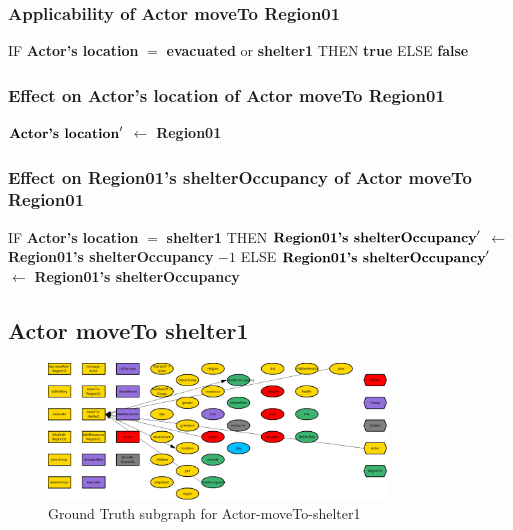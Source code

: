 \documentclass{article}%
\begin{document}
%
\subsubsection{Applicability of Actor moveTo Region01}%
\label{ssubsec:Applicability of Actor moveTo Region01}%
\begin{flushleft}%
IF %
\textbf{Actor's location}%
$=$%
\textbf{evacuated}%
 or %
\textbf{shelter1}%
\linebreak%
\hspace*{2em}%
THEN %
\textbf{true}%
\linebreak%
\hspace*{2em}%
ELSE %
\textbf{false}%
\end{flushleft}

%
\subsubsection{Effect on Actor's location of Actor moveTo Region01}%
\label{ssubsec:Effect on Actor's location of Actor moveTo Region01}%
\begin{flushleft}%
$\mbox{\textbf{Actor's location}} '$%
$\leftarrow$%
\textbf{Region01}%
\end{flushleft}

%
\subsubsection{Effect on Region01's shelterOccupancy of Actor moveTo Region01}%
\label{ssubsec:Effect on Region01's shelterOccupancy of Actor moveTo Region01}%
\begin{flushleft}%
IF %
\textbf{Actor's location}%
$=$%
\textbf{shelter1}%
\linebreak%
\hspace*{2em}%
THEN %
$\mbox{\textbf{Region01's shelterOccupancy}} '$%
$\leftarrow$%
\textbf{Region01's shelterOccupancy}%
${-}1$%
\linebreak%
\hspace*{2em}%
ELSE %
$\mbox{\textbf{Region01's shelterOccupancy}} '$%
$\leftarrow$%
\textbf{Region01's shelterOccupancy}%
\end{flushleft}

%
\subsection{Actor moveTo shelter1}%
\label{subsec:Actor moveTo shelter1}%


\begin{figure}[ht]%
\centering%
\includegraphics[width=0.8\textwidth]{images/Actor-moveTo-shelter1.png}%
\caption{Ground Truth subgraph for Actor{-}moveTo{-}shelter1}%
\end{figure}
\end{document}
